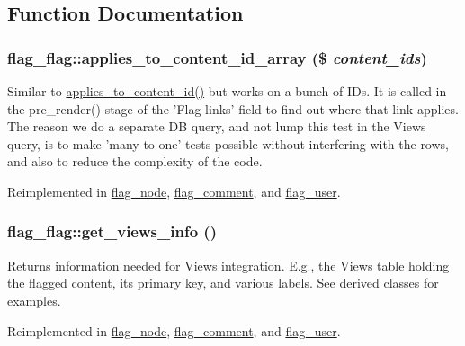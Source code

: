 \subsection{Function Documentation}
\hypertarget{group__views_g7ffe2653803be84d2c2d21dea608a6da}{
\subsubsection[{applies\_\-to\_\-content\_\-id\_\-array}]{\setlength{\rightskip}{0pt plus 5cm}flag\_\-flag::applies\_\-to\_\-content\_\-id\_\-array (\$ {\em content\_\-ids})}}
\label{group__views_g7ffe2653803be84d2c2d21dea608a6da}


Similar to \hyperlink{classflag__flag_a38afcc59d7d1ef028215521c6fcdc22}{applies\_\-to\_\-content\_\-id()} but works on a bunch of IDs. It is called in the pre\_\-render() stage of the 'Flag links' field to find out where that link applies. The reason we do a separate DB query, and not lump this test in the Views query, is to make 'many to one' tests possible without interfering with the rows, and also to reduce the complexity of the code. 

Reimplemented in \hyperlink{classflag__node_c1e88f053ece925c7f28c0e8fe4b020f}{flag\_\-node}, \hyperlink{classflag__comment_27a4b1110c52e7237c06dc6c3ad6c092}{flag\_\-comment}, and \hyperlink{classflag__user_0ccc7caff183a9e9067d49a89917c003}{flag\_\-user}.\hypertarget{group__views_g91f53a4d24f7c81f8a913e56154821c0}{
\subsubsection[{get\_\-views\_\-info}]{\setlength{\rightskip}{0pt plus 5cm}flag\_\-flag::get\_\-views\_\-info ()}}
\label{group__views_g91f53a4d24f7c81f8a913e56154821c0}


Returns information needed for Views integration. E.g., the Views table holding the flagged content, its primary key, and various labels. See derived classes for examples. 

Reimplemented in \hyperlink{classflag__node_bea5310889ebc0a8564823f3067d5846}{flag\_\-node}, \hyperlink{classflag__comment_e3f7ebade72b8cdac4042de702d2978b}{flag\_\-comment}, and \hyperlink{classflag__user_6964b8042fb9bb01e197705be533abba}{flag\_\-user}.